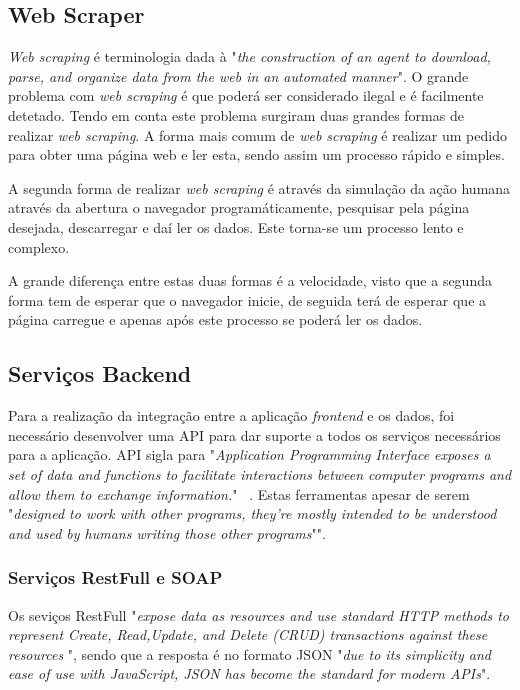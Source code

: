 \subsection{Web Scraper}
\textit{Web scraping} é terminologia dada à "\emph{the construction of an agent to download, parse, and organize data from the web in an automated manner}"\citep{web_scraping}. O grande problema com \textit{web scraping} é que poderá ser considerado ilegal e é facilmente detetado. Tendo em conta este problema surgiram duas grandes formas de realizar \textit{web scraping}. A forma mais comum de \textit{web scraping} é realizar um pedido para obter uma página web e ler esta, sendo assim um processo rápido e simples.

A segunda forma de realizar \textit{web scraping} é através da simulação da ação humana através da abertura o navegador programáticamente, pesquisar pela página desejada, descarregar e daí ler os dados. Este torna-se um processo lento e complexo. 

A grande diferença entre estas duas formas é a velocidade, visto que a segunda forma tem de esperar que o navegador inicie, de seguida terá de esperar que a página carregue e apenas após este processo se poderá ler os dados.

\subsection{Serviços Backend}

Para a realização da integração entre a aplicação \emph{frontend} e os dados, foi necessário desenvolver uma API para dar suporte a todos os serviços necessários para a aplicação.
API sigla para "\emph{Application Programming Interface} \emph{exposes a set of data and functions to facilitate interactions between computer programs and allow them to exchange information.}" ~\citep{rest_cookbook}.
Estas ferramentas apesar de serem "\emph{designed  to  work  with  other  programs,  they’re  mostly intended to be understood and used by humans writing those other programs}"\citep{api_design}".

\subsubsection{Serviços RestFull e SOAP}
Os seviços RestFull "\emph{expose data as resources  and  use  standard  HTTP  methods  to  represent  Create,  Read,Update,  and  Delete  (CRUD)  transactions  against  these  resources}
\citep{api_design}", sendo que a resposta é no formato JSON "\emph{due  to  its  simplicity  and  ease  of  use  with  JavaScript,  JSON  has become the standard for modern APIs}"\citep{api_design}.

